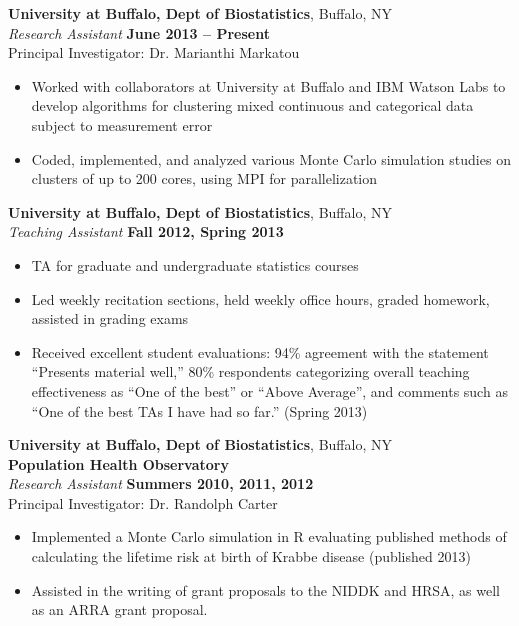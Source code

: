 \documentclass{article}
\begin{document}
 {\bf University at Buffalo, Dept of Biostatistics}, Buffalo, NY\\
 {\it Research Assistant} \hfill {\bf June 2013 -- Present} \\
 Principal Investigator: Dr. Marianthi Markatou 
 \begin{itemize} \itemsep -2pt
  \item Worked with collaborators at University at Buffalo and IBM Watson Labs to develop algorithms for clustering mixed continuous and categorical data subject to measurement error
  \item Coded, implemented, and analyzed various Monte Carlo simulation studies on clusters of up to 200 cores, using MPI for parallelization
 \end{itemize}

 {\bf University at Buffalo, Dept of Biostatistics}, Buffalo, NY\\
 {\it Teaching Assistant} \hfill {\bf Fall 2012, Spring 2013}
 \begin{itemize} \itemsep -2pt
  \item TA for graduate and undergraduate statistics courses
  \item Led weekly recitation sections, held weekly office hours, graded homework, assisted in grading exams
  \item Received excellent student evaluations: 94\% agreement with the statement ``Presents material well,'' 80\% respondents categorizing overall teaching effectiveness as ``One of the best'' or ``Above Average'', and comments such as ``One of the best TAs I have had so far.'' (Spring 2013)
 \end{itemize}
 
 {\bf University at Buffalo, Dept of Biostatistics}, Buffalo, NY\\
 {\bf Population Health Observatory}\\
 {\it Research Assistant} \hfill {\bf Summers 2010, 2011, 2012} \\
 Principal Investigator: Dr. Randolph Carter
 \begin{itemize} \itemsep -2pt
  \item Implemented a Monte Carlo simulation in R evaluating published 
        methods of calculating the lifetime risk at birth of Krabbe disease
        (published 2013)
  \item Assisted in the writing of grant proposals to the NIDDK and HRSA,
        as well as an ARRA grant proposal.
 \end{itemize}
\end{document}
